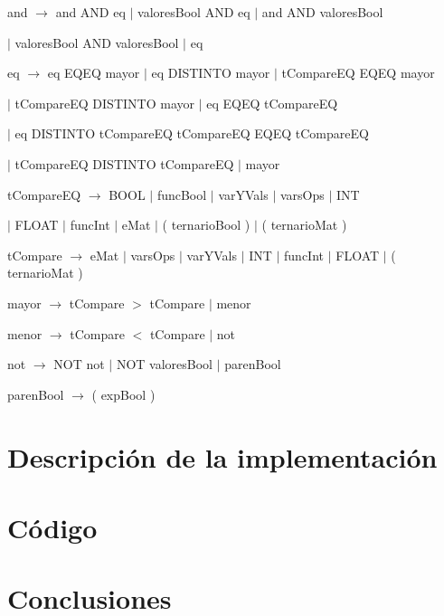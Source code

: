 \documentclass[10pt, a4paper]{article}
\begin{document}
 and $\rightarrow$ and AND eq $|$ valoresBool AND eq $|$ and AND valoresBool 
 
 \hspace{15mm}$|$ valoresBool AND valoresBool $|$ eq

 eq $\rightarrow$ eq EQEQ mayor $|$ eq DISTINTO mayor $|$ tCompareEQ EQEQ mayor 
 
 \hspace{15mm} $|$ tCompareEQ DISTINTO mayor $|$ eq EQEQ tCompareEQ  
 
 \hspace{15mm} $|$ eq DISTINTO tCompareEQ  tCompareEQ EQEQ tCompareEQ 
 
 \hspace{15mm} $|$ tCompareEQ DISTINTO tCompareEQ $|$ mayor
  
 
 tCompareEQ $\rightarrow$ BOOL $|$ funcBool $|$ varYVals $|$ varsOps $|$ INT
  
 \hspace{15mm} $|$ FLOAT $|$ funcInt $|$ eMat $|$ ( ternarioBool )  $|$ ( ternarioMat )
  
  
  tCompare $\rightarrow$ eMat $|$ varsOps $|$ varYVals $|$ INT $|$ funcInt  $|$ FLOAT $|$ ( ternarioMat ) 
  
  mayor  $\rightarrow$ tCompare $>$ tCompare $|$ menor
  
  menor  $\rightarrow$ tCompare $<$ tCompare $|$ not
  
   not  $\rightarrow$  NOT not $|$ NOT valoresBool $|$ parenBool
  
  parenBool  $\rightarrow$ ( expBool ) 
  
  
 
\section{Descripción de la implementación}

\section{Código}

\section{Conclusiones}
\end{document}
